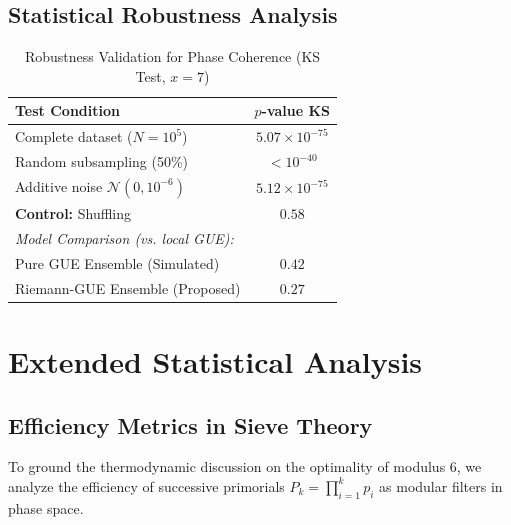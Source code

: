 \documentclass[12pt, a4paper]{article}
\theoremstyle{plain}
\theoremstyle{definition}
\theoremstyle{remark}
\begin{document}
\subsection{Statistical Robustness Analysis}
\label{ap:robustez}

\begin{table}[H]
\centering
\caption{Robustness Validation for Phase Coherence (KS Test, $x=7$)}
\label{tab:robustez}
\begin{tabular}{@{}lc@{}}
\toprule
\textbf{Test Condition} & \textbf{$p$-value KS} \\
\midrule
Complete dataset ($N=10^5$) & $5.07 \times 10^{-75}$ \\
Random subsampling (50\%) & $< 10^{-40}$ \\
Additive noise $\mathcal{N}(0, 10^{-6})$ & $5.12 \times 10^{-75}$ \\
\textbf{Control:} Shuffling & $0.58$ \\
\midrule
\multicolumn{2}{l}{\textit{Model Comparison (vs. local GUE):}} \\
Pure GUE Ensemble (Simulated) & $0.42$ \\
Riemann-GUE Ensemble (Proposed) & $\mathbf{0.27}$ \\
\bottomrule
\end{tabular}
\end{table}

\section{Extended Statistical Analysis}
\label{ap:estadistica}

\subsection{Efficiency Metrics in Sieve Theory}
\label{ap:eficiencia}

To ground the thermodynamic discussion on the optimality of modulus 6, we analyze the efficiency of successive primorials $P_k = \prod_{i=1}^k p_i$ as modular filters in phase space.
\end{document}
